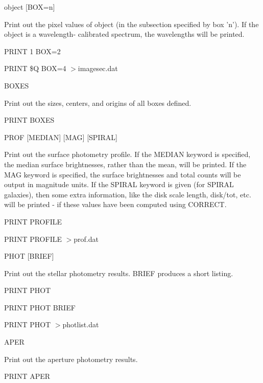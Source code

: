{\newpage\clearpage
{}%
\begin{example}
  \item[object {[BOX=n]}\hfill]{ Print out the pixel values of object (in
       the subsection specified by box 'n').  If the object is a
       wavelength- calibrated spectrum, the wavelengths will be printed.
  \begin{hanging}
    \item{PRINT 1 BOX=2}
    \item{PRINT \$Q BOX=4 $>$imagesec.dat}
  \end{hanging}
}
\par
\item[BOXES\hfill]{Print out the sizes, centers, and origins of all boxes
       defined.
  \begin{hanging}
    \item{PRINT BOXES}
  \end{hanging}
}
\par
\item[PROF {[MEDIAN]} {[MAG]} {[SPIRAL]}\hfill]{ Print out the surface
       photometry profile.  If the MEDIAN keyword is specified, the median
       surface brightnesses, rather than the mean, will be printed. If the
       MAG keyword is specified, the surface brightnesses and total counts
       will be output in magnitude units. If the SPIRAL keyword is given
       (for SPIRAL galaxies), then some extra information, like the disk
       scale length, disk/tot, etc. will be printed - if these values have
       been computed using CORRECT.
  \begin{hanging}
    \item{PRINT PROFILE}
    \item{PRINT PROFILE $>$prof.dat}
  \end{hanging}
}
\par
\item[PHOT {[BRIEF]}\hfill]{ Print out the stellar photometry results.
       BRIEF produces a short listing.
  \begin{hanging}
    \item{PRINT PHOT }
    \item{PRINT PHOT BRIEF}
    \item{PRINT PHOT $>$photlist.dat}
  \end{hanging}
}
\par
\item[APER\hfill]{ Print out the aperture photometry results.
  \begin{hanging}
    \item{PRINT APER}

\end{hanging}}
\end{example}}
